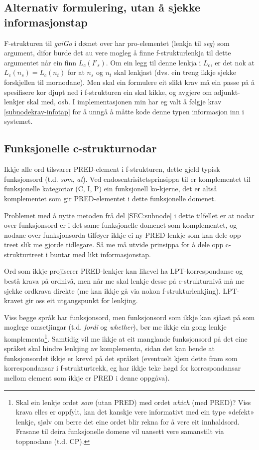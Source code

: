 \documentclass[11pt,a4paper,oneside,draft]{book}
\begin{document}
\subsection{Alternativ formulering, utan å sjekke informasjonstap}
\label{sec-3.7.1}

F-strukturen til \emph{gaiGo} i dømet over har pro-elementet (lenkja til
\emph{seg}) som argument, difor burde det au vere mogleg å finne
f-strukturlenkja til dette argumentet når ein finn $L_c(I'_s)$. Om ein
legg til denne lenkja i $L_c$, er det nok at $L_c(n_s)=L_c(n_t)$ for
at $n_s$ og $n_t$ skal lenkjast (dvs. ein treng ikkje sjekke
forskjellen til mornodane). Men skal ein formulere eit slikt krav må
ein passe på å spesifisere kor djupt ned i f-strukturen ein skal
kikke, og avgjere om adjunkt-lenkjer skal med, osb. I implementasjonen
min har eg valt å følgje krav \ref{subnodekrav-infotap} for å unngå å
måtte kode denne typen informasjon inn i systemet.

\subsection{Funksjonelle c-strukturnodar}
\label{sec-3.7.2}

\label{SEC:fnord}

Ikkje alle ord tilsvarer PRED-element i f-strukturen, dette gjeld
typisk funksjonsord (t.d. \emph{som}, \emph{at}). Ved endosentrisitetsprinsippa
til \citet{bresnan2001lfs} er komplementet til funksjonelle kategoriar
(C, I, P) ein funksjonell ko-kjerne, det er altså komplementet som gir
PRED-elementet i dette funksjonelle domenet.

Problemet med å nytte metoden frå del \ref{SEC:subnode} i dette
tilfellet er at nodar over funksjonsord er i det same funksjonelle
domenet som komplementet, og nodane over funksjonsorda tilføyer ikkje
ei ny PRED-lenkje som kan dele opp treet slik me gjorde tidlegare. Så
me må utvide prinsippa for å dele opp c-strukturtreet i buntar med
likt informasjonstap.

Ord som ikkje projiserer PRED-lenkjer kan likevel ha
LPT-korrespondanse og bestå krava på ordnivå, men når me skal lenkje
desse på c-strukturnivå må me sjekke ordkrava direkte (me kan ikkje gå
via nokon f-strukturlenkjing). LPT-kravet gir oss eit utgangspunkt for
lenkjing.

Viss begge språk har funksjonsord, men funksjonsord som ikkje kan
sjåast på som moglege omsetjingar (t.d. \emph{fordi} og \emph{whether}), bør me
ikkje ein gong lenkje komplementa\footnote{Skal ein lenkje ordet \emph{som} (utan PRED) med ordet \emph{which} (med
        PRED)? Viss krava elles er oppfylt, kan det kanskje vere
        informativt med ein type «defekt» lenkje, sjølv om berre det
        eine ordet blir rekna for å vere eit innhaldsord. Frasane til
        deira funksjonelle domene vil uansett vere samanstilt via
        toppnodane (t.d. CP). }. Samtidig vil me ikkje at eit
manglande funksjonsord på det eine språket skal hindre lenkjing av
komplementa, sidan det kan hende at funksjonsordet ikkje er krevd på
det språket (eventuelt kjem dette fram som korrespondansar i
f-strukturtrekk, eg har ikkje teke høgd for korrespondansar mellom
element som ikkje er PRED i denne oppgåva).
\end{document}
